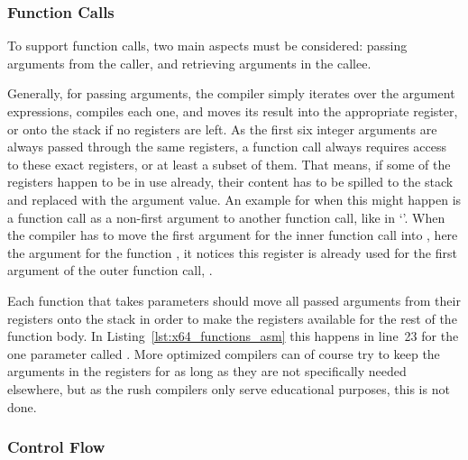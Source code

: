 
\subsubsection{Function Calls}


To support function calls, two main aspects must be considered: passing arguments from the caller, and retrieving arguments in the callee.

Generally, for passing arguments, the compiler simply iterates over the argument expressions, compiles each one, and moves its result into the appropriate register, or onto the stack if no registers are left.
As the first six integer arguments are always passed through the same registers, a function call always requires access to these exact registers, or at least a subset of them.
That means, if some of the registers happen to be in use already, their content has to be spilled to the stack and replaced with the argument value.
An example for when this might happen is a function call as a non-first argument to another function call, like in `'.
When the compiler has to move the first argument for the inner function call into , here the argument  for the function , it notices this register is already used for the first argument of the outer function call, .

Each function that takes parameters should move all passed arguments from their registers onto the stack in order to make the registers available for the rest of the function body.
In Listing~\ref{lst:x64_functions_asm} this happens in line~23 for the one parameter called .
More optimized compilers can of course try to keep the arguments in the registers for as long as they are not specifically needed elsewhere, but as the rush compilers only serve educational purposes, this is not done.

\subsubsection{Control Flow}


